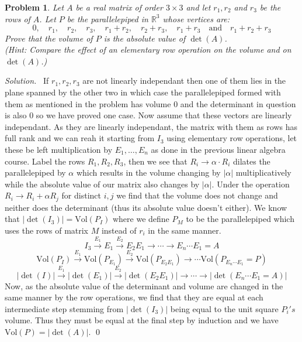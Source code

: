 \documentclass[12pt,a4paper]{article}
\newenvironment{solution}{%
  \par\noindent\textit{Solution.}\ }{\qed}
\theoremstyle{problemstyle}
\newtheorem{problem}{Problem}[section]
\begin{document}
\begin{problem}\label{prob:1.2}
    Let $A$ be a real matrix of order $3 \times 3$ and let $r_1, r_2$ and $r_3$ be the rows of $A$. Let $P$ be the parallelepiped in $\mathbb{R}^3$ whose vertices are:
    \[
        0, \quad r_1, \quad r_2, \quad r_3, \quad r_1+r_2, \quad r_2+r_3, \quad r_1+r_3 \quad \text{and} \quad r_1+r_2+r_3
    \]
    Prove that the volume of $P$ is the absolute value of $\det(A)$. \\
    \textit{(Hint: Compare the effect of an elementary row operation on the volume and on $\det(A)$.)}
\end{problem}
\begin{solution}
    If $r_1,r_2,r_3$ are not linearly independant then one of them lies in the plane spanned by the other two in which case the parallelepiped formed with them as mentioned in the problem has volume $0$ and the determinant in question is also $0$ so we have proved one case. 
    Now assume that these vectors are linearly independant. 
    As they are linearly independant, the matrix with them as rows has full rank and we can reah it starting from $I_3$ using elementary row operations, let these be left multiplication by $E_1,\ldots,E_n$ as done in the previous linear algebra course. 
    Label the rows $R_1,R_2,R_3$, then we see that $R_i\to\alpha\cdot R_i$ dilates the parallelepiped by $\alpha$ which results in the volume changing by $|\alpha|$ multiplicatively while the absolute value of our matrix also changes by $|\alpha|$. 
    Under the operation $R_i\to R_i+\alpha R_j$ for distinct $i,j$ we find that the volume does not change and neither does the determinant (thus its absolute value doesn't either). 
    We know that $|\det(I_3)|=\text{Vol}(P_I)$ where we define $P_M$ to be the parallelepiped which uses the rows of matrix $M$ instead of $r_i$ in the same manner. 
    $$I_3\xrightarrow{E_1}E_1\xrightarrow{E_2}E_2E_1\longrightarrow\cdots\longrightarrow E_n\cdots E_1=A$$
    $$\text{Vol}(P_I)\xrightarrow{E_1}\text{Vol}(P_{E_1})\xrightarrow{E_2}\text{Vol}(P_{E_2E_1})\longrightarrow\cdots\text{Vol}(P_{E_n\cdots E_1}=P)$$
    $$|\det(I)|\xrightarrow{E_1}|\det(E_1)|\xrightarrow{E_2}|\det(E_2E_1)|\longrightarrow\cdots\longrightarrow|\det(E_n\cdots E_1=A)|$$
    Now, as the absolute value of the determinant and volume are changed in the same manner by the row operations, we find that they are equal at each intermediate step stemming from $|\det(I_3)|$ being equal to the unit square $P_{i}'s$ volume. 
    Thus they must be equal at the final step by induction and we have $\text{Vol}(P)=|\det(A)|$.
\end{solution}
\end{document}
